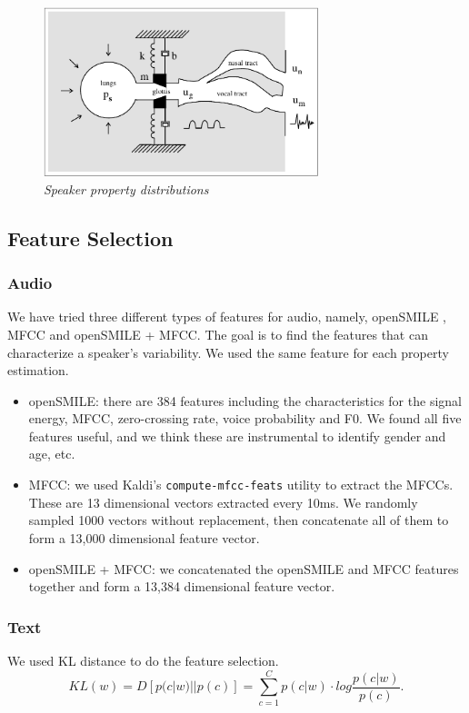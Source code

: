 \documentclass[a4paper]{article}
\begin{document}
\begin{figure}[t]
\centerline{\includegraphics[width=80mm]{figure}}
\caption{{\it Speaker property distributions}}  
\label{dists}
\end{figure}

\subsection{Feature Selection}
\subsubsection{Audio}
We have tried three different types of features for audio, namely, openSMILE \cite{eyben}, MFCC and openSMILE + MFCC. The goal is to find the features that can characterize a speaker's variability. We used the same feature for each property estimation.

\begin{itemize}
\item openSMILE: there are 384 features including the characteristics for the signal energy, MFCC, zero-crossing rate, voice probability and F0. We found all five features useful, and we think these are instrumental to identify gender and age, etc.

\item MFCC: we used Kaldi's \cite{povey} \texttt{compute-mfcc-feats} utility to extract the MFCCs. These are 13 dimensional vectors extracted every 10ms. We randomly sampled 1000 vectors without replacement, then concatenate all of them to form a 13,000 dimensional feature vector.

\item openSMILE + MFCC: we concatenated the openSMILE and MFCC features together and form a 13,384 dimensional feature vector.
\end{itemize}

\subsubsection{Text}
We used KL distance to do the feature selection.
\begin{equation}
  KL(w) = D[p(c|w)||p(c)] = \sum_{c=1}^{C}p(c|w)\cdot log\frac{p(c|w)}{p(c)}.
\label{kl}
\end{equation}
\end{document}
